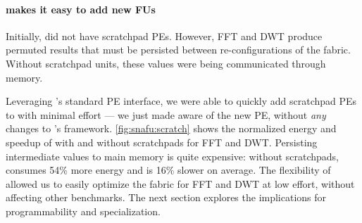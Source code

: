 \figSNAFUScratchResults
\paragraph{\snafuframe makes it easy to add new FUs}
Initially, \snafuarch did not have scratchpad PEs.
%
However, FFT and DWT produce permuted results that must be persisted between re-configurations of the fabric.
%
Without scratchpad units, these values were being communicated through memory.

Leveraging \snafuframe's standard PE interface,
we were able to quickly add scratchpad PEs to \snafuarch with minimal effort --- we just made \snafuframe aware of the new PE,
without \emph{any} changes to \snafuframe's framework.
% 
\autoref{fig:snafu:scratch} shows the normalized energy and speedup of \snafuarch with and without scratchpads
for FFT and DWT.
%
Persisting intermediate values to main memory is quite expensive:
without scratchpads, \snafuarch consumes 54\% more energy and is 16\% slower on average.
% 
The flexibility of \snafuframe allowed us to easily optimize the \snafuarch fabric for FFT and DWT at low effort, without affecting other benchmarks.
%
The next section explores the implications for programmability and specialization.
